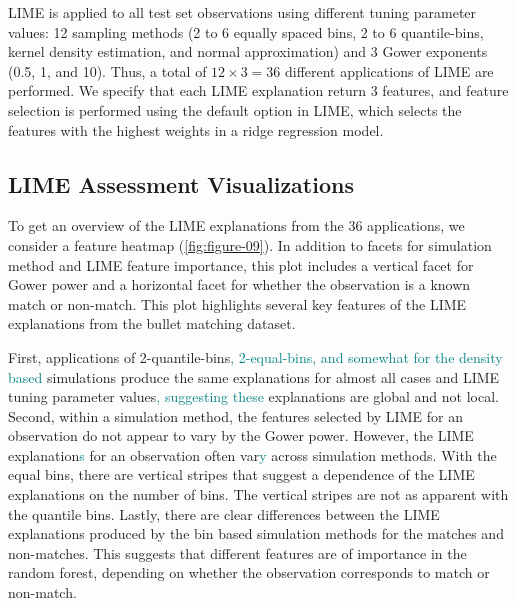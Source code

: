 \documentclass[AMS,STIX2COL]{WileyNJD-v2}\usepackage[]{graphicx}\usepackage[]{color}
\newcommand{\kge}[1]{\textcolor{teal}{#1}}
\renewcommand{\sout}[1]{\unskip}
\begin{document}
LIME is applied to all test set observations using different tuning parameter values: 12 sampling methods (2 to 6 equally spaced bins, 2 to 6 quantile-bins, kernel density estimation, and normal approximation) and 3 Gower exponents (0.5, 1, and 10). Thus, a total of $12\times 3=36$ different applications of LIME are performed. We specify that each LIME explanation return 3 features, and feature selection is performed using the default option in LIME, which selects the features with the highest weights in a ridge regression model.







\subsection{LIME Assessment Visualizations} \label{bullet-assess-ex}

To get an overview of the LIME explanations from the 36 applications, we consider a feature heatmap (\autoref{fig:figure-09}). In addition to facets for simulation method and LIME feature importance, this plot includes a vertical facet for Gower power and a horizontal facet for whether the observation is a known match or non-match. This plot highlights several key features of the LIME explanations from the bullet matching dataset.

First, applications of 2-quantile-bins\kge{, 2-equal-bins, and somewhat for the density based} simulations produce the same explanations for almost all cases and LIME tuning parameter values\kge{,}\sout{. This suggests that the LIME} \kge{suggesting these} explanations are global and not local. Second, within a simulation method, the features selected by LIME for an observation do not appear to vary by the Gower power. However, the LIME explanation\kge{s} for an observation often var\kge{y}\sout{ies} across simulation methods. With the equal bins, there are vertical stripes that suggest a dependence of the LIME explanations on the number of bins. The vertical stripes are not as apparent with the quantile bins. Lastly, there are clear differences between the LIME explanations produced by the bin based simulation methods for the matches and non-matches. This suggests that different features are of importance in the random forest, depending on whether the observation corresponds to match or non-match.
\end{document}
